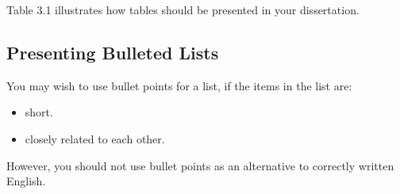 Table 3.1 illustrates how tables should be presented in your dissertation. 

\subsection{Presenting Bulleted Lists}
You may wish to use bullet points for a list, if the items in the list are:

\begin{itemize}
	\item short.
	\item closely related to each other.
\end{itemize}

However, you should not use bullet points as an alternative to correctly written English. 
